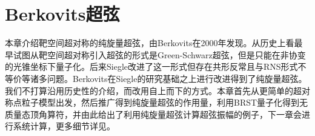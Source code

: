 \chapter{Berkovits超弦}
\label{chap:5}
本章介绍靶空间超对称的纯旋量超弦，由Berkovits在2000年发现\cite{Berkovits:2000fe}。从历史上看最早试图从靶空间超对称引入超弦的形式是Green-Schwarz超弦\cite{Green:1983wt,Green:1983sg}，但是只能在非协变的光锥坐标下量子化。后来Siegle改进了这一形式但存在共形反常且与RNS形式不等价等诸多问题\cite{Siegel:1985xj}。Berkovits在Siegle的研究基础之上进行改进得到了纯旋量超弦。我们不打算沿用历史性的介绍\cite{Berkovits:2002zk,Mafra:2008gkx}，而改用自上而下的方式。本章首先从更简单的超对称点粒子模型出发，然后推广得到纯旋量超弦的作用量，利用BRST量子化得到无质量态顶角算符，并由此给出了利用纯旋量超弦计算超弦振幅的例子，下一章会进行系统计算，更多细节详见\cite{Berkovits:2017ldz,Mafra:2022wml}。

